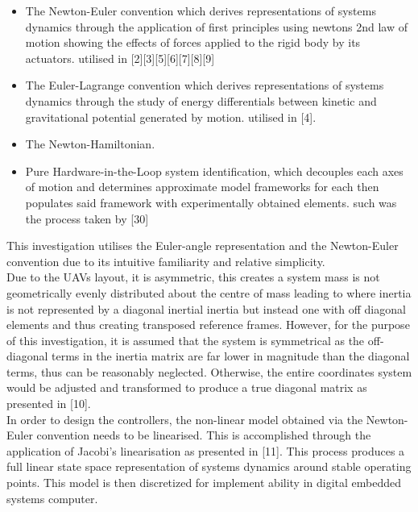 \documentclass[12pt,a4paper,twoside]{report}
\begin{document}
				\begin{itemize}
					\item
						The Newton-Euler convention which derives representations of systems dynamics through the application of first principles using newtons 2nd law of motion showing the effects of forces applied to the rigid body by its actuators. utilised in [2][3][5][6][7][8][9]
					\item 
						The Euler-Lagrange convention which derives representations of systems dynamics through the study of energy differentials between kinetic and gravitational potential generated by motion. utilised in [4]. 
					\item 
						The Newton-Hamiltonian.
					\item 
						Pure Hardware-in-the-Loop system identification, which decouples each axes of motion and determines approximate model frameworks for each then populates said framework with experimentally obtained elements. such was the process taken by [30]
				\end{itemize}
				
				This investigation utilises the Euler-angle representation and the Newton-Euler convention due to its intuitive familiarity and relative simplicity.
				\\
				Due to the UAVs layout, it is asymmetric, this creates a system mass is not geometrically evenly distributed about the centre of mass leading to where inertia is not represented by a diagonal inertial inertia but instead one with off diagonal elements and thus creating transposed reference frames. However, for the purpose of this investigation, it is assumed that the system is symmetrical as the off-diagonal terms in the inertia matrix are far lower in magnitude than the diagonal terms, thus can be reasonably neglected. Otherwise, the entire coordinates system would be adjusted and transformed to produce a true diagonal matrix as presented in [10]. 
				\\
				In order to design the controllers, the non-linear model obtained via the Newton-Euler convention needs to be linearised. This is accomplished through the application of Jacobi’s linearisation as presented in [11]. This process produces a full linear state space representation of systems dynamics around stable operating points. This model is then discretized for implement ability in digital embedded systems computer.
				
\end{document}
